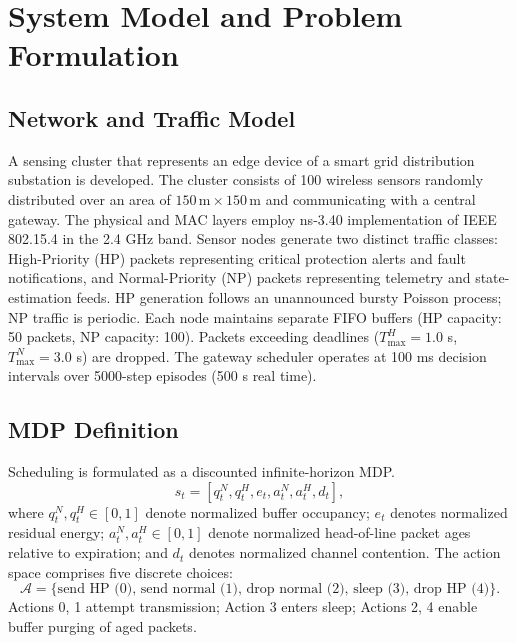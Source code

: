 \documentclass[runningheads]{llncs}
\begin{document}
\section{System Model and Problem Formulation}
\subsection{Network and Traffic Model}
A sensing cluster that represents an edge device of a smart grid distribution substation is developed. The cluster consists of 100 wireless sensors randomly distributed over an area of $150\,\mathrm{m}\times150\,\mathrm{m}$ and communicating with a central gateway. The physical and MAC layers employ ns-3.40 implementation of IEEE 802.15.4 in the 2.4 GHz band. Sensor nodes generate two distinct traffic classes: High-Priority (HP) packets representing critical protection alerts and fault notifications, and Normal-Priority (NP) packets representing telemetry and state-estimation feeds. HP generation follows an unannounced bursty Poisson process; NP traffic is periodic. Each node maintains separate FIFO buffers (HP capacity: 50 packets, NP capacity: 100). Packets exceeding deadlines ($T_{\max}^{H}=1.0$ s, $T_{\max}^{N}=3.0$ s) are dropped. The gateway scheduler operates at 100 ms decision intervals over 5000-step episodes (500 s real time).

\subsection{MDP Definition}
Scheduling is formulated as a discounted infinite-horizon MDP.
\begin{equation}
 s_t=\left[q_t^N,q_t^H,e_t,a_t^N,a_t^H,d_t\right],
 \label{eq:state}
\end{equation}
where $q_t^N,q_t^H\in[0,1]$ denote normalized buffer occupancy; $e_t$ denotes normalized residual energy; $a_t^N,a_t^H\in[0,1]$ denote normalized head-of-line packet ages relative to expiration; and $d_t$ denotes normalized channel contention. The action space comprises five discrete choices:
\begin{equation}
 \mathcal{A}=\{\text{send HP (0), send normal (1), drop normal (2), sleep (3), drop HP (4)}\}.
 \label{eq:actions}
\end{equation}
Actions 0, 1 attempt transmission; Action 3 enters sleep; Actions 2, 4 enable buffer purging of aged packets.
\end{document}
